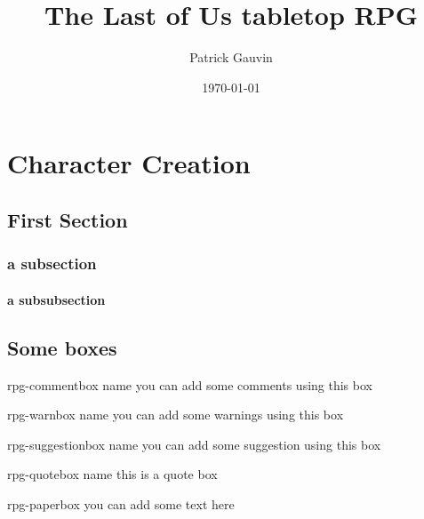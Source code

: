 \documentclass[10pt,twoside,twocolumn]{book}
\title{The Last of Us tabletop RPG}
\date{\today}
\author{Patrick Gauvin}
\begin{document}
\selectfont %
\frontmatter

\maketitle
\begin{multicols}{2}
\tableofcontents
\end{multicols}

%
%
\mainmatter
\chapter{Character Creation}

\section{First Section}
\lipsum[1] %

\subsection{a subsection}
\subsubsection{a subsubsection}

\section{Some boxes}

\begin{rpg-commentbox}{rpg-commentbox name}
	you can add some comments using this box
\end{rpg-commentbox}

\begin{rpg-warnbox}{rpg-warnbox name}
	you can add some warnings using this box
\end{rpg-warnbox}

\begin{rpg-suggestionbox}{rpg-suggestionbox name}
	you can add some suggestion using this box
\end{rpg-suggestionbox}

\begin{rpg-quotebox}{rpg-quotebox name}
    this is a quote box
\end{rpg-quotebox}

\begin{rpg-paperbox}{rpg-paperbox}
	you can add some text here
\end{rpg-paperbox}
\end{document}
